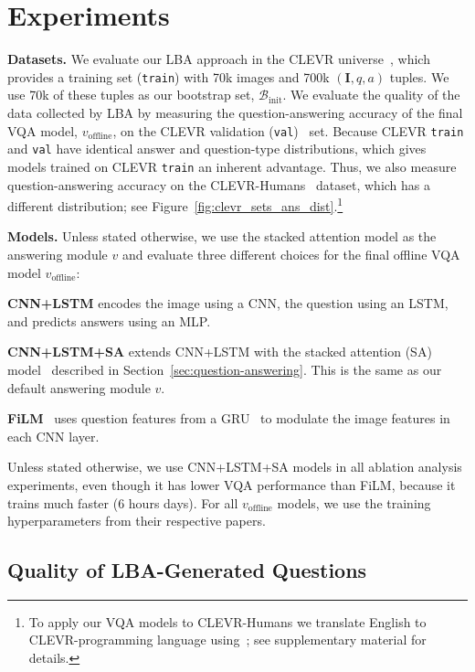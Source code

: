 \documentclass[10pt,twocolumn,letterpaper]{article}
\newcommand{\imageQApair}{(\mathbf{I}, q, a)}
\newcommand{\voffline}{v_{\mathrm{offline}}}
\newcommand{\bootstrap}{\mathcal{B}_{\mathrm{init}}}
\newcommand{\clevrtrain}{\texttt{train}\xspace}
\newcommand{\clevrval}{\texttt{val}\xspace}
\begin{document}
\vspace{-0.05in}
\section{Experiments}
\vspace{-0.05in}
\par \noindent \textbf{Datasets.}
We evaluate our LBA approach in the CLEVR universe~\cite{johnson16clevr}, which provides a training set (\clevrtrain) with 70k images and 700k $\imageQApair$ tuples. We use 70k of these tuples as our bootstrap set, $\bootstrap$. We evaluate the quality of the data collected by LBA by measuring the question-answering accuracy of the final VQA model, $\voffline$, on the CLEVR validation (\clevrval)~\cite{johnson16clevr} set. Because CLEVR \clevrtrain and \clevrval have identical answer and question-type distributions, which gives models trained on CLEVR \clevrtrain an inherent advantage. Thus, we also measure question-answering accuracy on the CLEVR-Humans~\cite{johnson17module} dataset, which has a different distribution; see Figure~\ref{fig:clevr_sets_ans_dist}.\footnote{To apply our VQA models to CLEVR-Humans we translate English to CLEVR-programming language using~\cite{johnson17module}; see supplementary material for details.}

\par \noindent \textbf{Models.}
Unless stated otherwise, we use the stacked attention model as the answering module $v$ and evaluate three different choices for the final offline VQA model $\voffline$: 
\par \noindent \textbf{CNN+LSTM} encodes the image using a CNN, the question using an LSTM, and predicts answers using an MLP. 
\par \noindent \textbf{CNN+LSTM+SA} extends CNN+LSTM with the stacked attention (SA) model~\cite{yang16stacked} described in Section~\ref{sec:question-answering}. This is the same as our default answering module $v$.
\par \noindent \textbf{FiLM}~\cite{perez17film} uses question features from a GRU~\cite{cho2014properties} to modulate the image features in each CNN layer.

Unless stated otherwise, we use CNN+LSTM+SA models in all ablation analysis experiments, even though it has lower VQA performance than FiLM, because it trains much faster (6 hours  days). For all $\voffline$ models, we use the training hyperparameters from their respective papers.

\subsection{Quality of LBA-Generated Questions}
\label{sec:compare_clevr}
\end{document}
